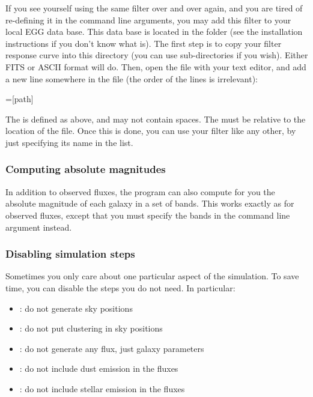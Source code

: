 \documentclass[12pt,a4paper]{article}
\newcommand{\egg}{\textsc{EGG}\xspace}
\begin{document}
If you see yourself using the same filter over and over again, and you are tired of re-defining it in the command line arguments, you may add this filter to your local \egg data base. This data base is located in the
 folder (see the installation instructions if you don't know what  is).
The first step is to copy your filter response curve into this directory (you can use sub-directories if you wish). Either FITS or ASCII format will do. Then, open the  file with your text editor, and add a new line somewhere in the file (the order of the lines is irrelevant):
\begin{bashcode}
=[path]
\end{bashcode}
The  is defined as above, and may not contain spaces. The \bashinline{[path]} must be relative to the location of the  file. Once this is done, you can use your filter like any other, by just specifying its name in the  list.


\subsubsection{Computing absolute magnitudes}

In addition to observed fluxes, the program can also compute for you the absolute magnitude of each galaxy in a set of bands. This works exactly as for observed fluxes, except that you must specify the bands in the  command line argument instead.


\subsubsection{Disabling simulation steps}

Sometimes you only care about one particular aspect of the simulation. To save time, you can disable the steps you do not need. In particular:
\begin{itemize}
\item {}: do not generate sky positions
\item {}: do not put clustering in sky positions
\item {}: do not generate any flux, just galaxy parameters
\item {}: do not include dust emission in the fluxes
\item {}: do not include stellar emission in the fluxes
\end{itemize}
\end{document}
